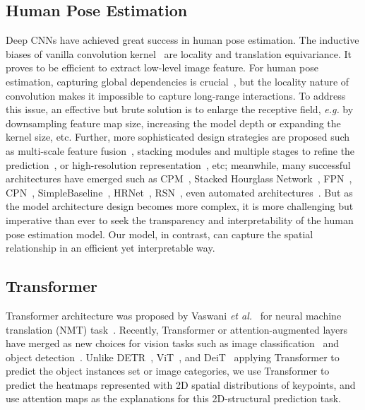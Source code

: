 \documentclass{article}
\begin{document}
\subsection{Human Pose Estimation}
Deep CNNs have achieved great success in human pose estimation. The inductive biases of vanilla convolution kernel~\cite{lecun1998gradient, krizhevsky2012imagenet} are locality and translation equivariance. It proves to be efficient to extract low-level image feature. For human pose estimation, capturing global dependencies is crucial~\cite{ramakrishna2014pose,tompson2014joint,wei2016convolutional,papandreou2018PersonLabPP}, but the locality nature of convolution makes it impossible to capture long-range interactions. To address this issue, an effective but brute solution is to enlarge the receptive field, \emph{e.g.} by downsampling feature map size, increasing the model depth or expanding the kernel size, etc. Further, more sophisticated design strategies are proposed such as multi-scale feature fusion~\cite{newell2016stacked, pfister2015flowing, yang2017learning, chen2018cascaded, sun2019hrnet, chu2017multi, cheng2020higher}, stacking modules and multiple stages to refine the prediction~\cite{wei2016convolutional,xiao2018simple, newell2016stacked}, or high-resolution representation~\cite{sun2019hrnet}, etc; meanwhile, many successful architectures have emerged such as CPM~\cite{wei2016convolutional}, Stacked Hourglass Network~\cite{newell2016stacked}, FPN~\cite{yang2017learning}, CPN~\cite{chen2018cascaded}, SimpleBaseline~\cite{xiao2018simple}, HRNet~\cite{sun2019hrnet}, RSN~\cite{cai2020learning}, even automated architectures~\cite{yang2019pose,gong2020autopose,mcnally2020evopose2d, cheng2020scalenas, zhang2020efficientpose}. But as the model architecture design becomes more complex, it is more challenging but imperative than ever to seek the transparency and interpretability of the human pose estimation model. Our model, in contrast, can capture the spatial relationship in an efficient yet interpretable way. 


\subsection{Transformer}

	Transformer architecture was proposed by Vaswani \emph{et al.}~\cite{vaswani2017attention} for neural machine translation (NMT) task~\cite{sutskever2014sequence}. Recently, Transformer or attention-augmented layers have merged as new choices for vision tasks such as image classification~\cite{parmar2018image, ramachandran2019stand, bello2019attention, dosovitskiy2020an,touvron2020deit} and object detection~\cite{carion2020detr}. Unlike DETR~\cite{carion2020detr}, ViT~\cite{dosovitskiy2020an}, and DeiT~\cite{touvron2020deit} applying Transformer to predict the object instances set or image categories, we use Transformer to predict the heatmaps represented with 2D spatial distributions of keypoints, and use attention maps as the explanations for this 2D-structural prediction task. 
\end{document}
